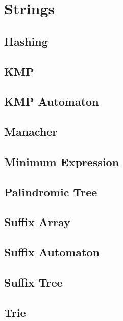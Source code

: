 \section{Strings}
\subsection{Hashing}
\raggedbottom
\hrulefill
\subsection{KMP}
\raggedbottom
\hrulefill
\subsection{KMP Automaton}
\raggedbottom
\hrulefill
\subsection{Manacher}
\raggedbottom
\hrulefill
\subsection{Minimum Expression}
\raggedbottom
\hrulefill
\subsection{Palindromic Tree}
\raggedbottom
\hrulefill
\subsection{Suffix Array}
\raggedbottom
\hrulefill
\subsection{Suffix Automaton}
\raggedbottom
\hrulefill
\subsection{Suffix Tree}
\raggedbottom
\hrulefill
\subsection{Trie}
\raggedbottom
\hrulefill
